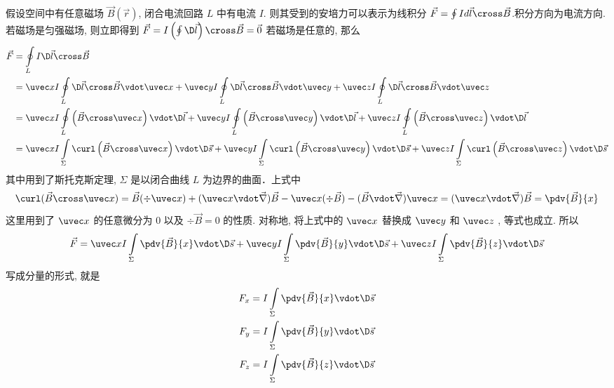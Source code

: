 

假设空间中有任意磁场 $\vec B\left( {\vec r} \right)$, 闭合电流回路 $L$ 中有电流 $I$. 则其受到的安培力可以表示为线积分 $\vec F = \oint{Id\vec l \cross \vec B} $.积分方向为电流方向.
若磁场是匀强磁场, 则立即得到 $\vec F = I\left( {\oint {\D \vec l} } \right) \cross \vec B = \vec 0$
若磁场是任意的, 那么
\begin{equation}
\begin{aligned}
\vec F &= \oint\limits_L {I\D \vec l \cross \vec B} \\
&= \uvec xI\oint\limits_L {\D \vec l \cross \vec B}  \vdot \uvec x + \uvec yI\oint\limits_L {\D \vec l \cross \vec B}  \vdot \uvec y + \uvec zI\oint\limits_L {\D \vec l \cross \vec B}  \vdot \uvec z\\
&= \uvec xI\oint\limits_L {\left( {\vec B \cross \uvec x} \right) \vdot \D \vec l}  + \uvec yI\oint\limits_L {\left( {\vec B \cross \uvec y} \right) \vdot \D \vec l}  + \uvec zI\oint\limits_L {\left( {\vec B \cross \uvec z} \right) \vdot \D \vec l} \\
&= \uvec xI\int\limits_\Sigma  {\curl \left( {\vec B \cross \uvec x} \right) \vdot \D \vec s}  + \uvec yI\int\limits_\Sigma  {\curl \left( {\vec B \cross \uvec y} \right) \vdot \D \vec s}  + \uvec zI\int\limits_\Sigma  {\curl \left( {\vec B \cross \uvec z} \right) \vdot \D \vec s} 
\end{aligned}
\end{equation}
其中用到了斯托克斯定理, $\Sigma $ 是以闭合曲线 $L$ 为边界的曲面．上式中
\begin{equation}
\curl (\vec B \cross \uvec x) = \vec B (\div \uvec x) + (\uvec x\vdot\vec\nabla )\vec B - \uvec x (\div \vec B) - (\vec B \vdot\vec\nabla)\uvec x = (\uvec x\vdot\vec\nabla)\vec B = \pdv{\vec B}{x}
\end{equation} 
这里用到了 $\uvec x$ 的任意微分为 0 以及 $\div \vec B = 0$ 的性质.
对称地, 将上式中的 $\uvec x$ 替换成 $\uvec y$ 和 $\uvec z$ , 等式也成立. 所以
\begin{equation}
\vec F = \uvec xI\int\limits_\Sigma  {\pdv{\vec B}{x} \vdot \D \vec s}  + \uvec yI\int\limits_\Sigma  {\pdv{\vec B}{y} \vdot \D \vec s}  + \uvec zI\int\limits_\Sigma  {\pdv{\vec B}{z} \vdot \D \vec s} 
\end{equation} 
写成分量的形式, 就是
\begin{gather}
{F_x} = I\int\limits_\Sigma  {\pdv{\vec B}{x} \vdot \D \vec s} \\
{F_y} = I\int\limits_\Sigma  {\pdv{\vec B}{y} \vdot \D \vec s} \\
{F_z} = I\int\limits_\Sigma  {\pdv{\vec B}{z} \vdot \D \vec s}
\end{gather} 








